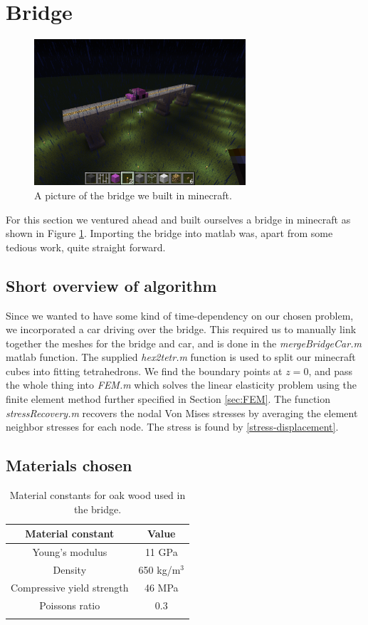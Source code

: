 \section{Bridge}

\begin{figure}
\center
\includegraphics[trim=0cm 5cm 7cm 7cm, clip=true, width=0.7\textwidth]{pic_bridge}
\caption{A picture of the bridge we built in minecraft.}
\label{fig:picBridge}
\end{figure}


For this section we ventured ahead and built ourselves a bridge in minecraft as shown in Figure \ref{fig:picBridge}. Importing the bridge into matlab was, apart from some tedious work, quite straight forward.


\subsection{Short overview of algorithm}
Since we wanted to have some kind of time-dependency on our chosen problem, we incorporated a car driving over the bridge. This required us to manually link together the meshes for the bridge and car, and is done in the \textit{mergeBridgeCar.m} matlab function. The supplied \textit{hex2tetr.m} function is used to split our minecraft cubes into fitting tetrahedrons. We find the boundary points at $z = 0$, and pass the whole thing into \textit{FEM.m} which solves the linear elasticity problem using the finite element method further specified in Section \ref{sec:FEM}. The function \textit{stressRecovery.m} recovers the nodal Von Mises stresses by averaging the element neighbor stresses for each node. The stress is found by \eqref{stress-displacement}.


\subsection{Materials chosen}
\begin{table}
\center
\caption{Material constants for oak wood used in the bridge.} 
\begin{tabular}{cc}
Material constant & Value \\ 
\hline \noalign{\smallskip}
Young's modulus & 11 GPa \\ 
Density & 650 kg/m$^3$ \\ 
Compressive yield strength & 46 MPa \\ 
Poissons ratio & 0.3 \\ 
\label{tab:oak}
\end{tabular}
\end{table}


